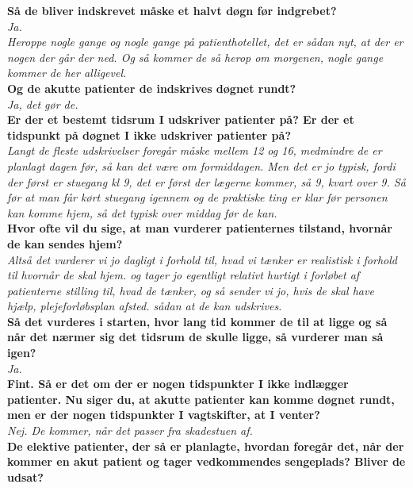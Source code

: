 \noindent
\textbf{Så de bliver indskrevet måske et halvt døgn før indgrebet?} \\
\noindent
\textit{Ja.} \\
\noindent
\textit{Heroppe nogle gange og nogle gange på patienthotellet, det er sådan nyt, at der er nogen der går der ned. Og så kommer de så herop om morgenen, nogle gange kommer de her alligevel.} \\
\noindent
\textbf{Og de akutte patienter de indskrives døgnet rundt?} \\
\noindent
\textit{ Ja, det gør de.} \\
\noindent
\textbf{Er der et bestemt tidsrum I udskriver patienter på? Er der et tidspunkt på døgnet I ikke udskriver patienter på?} \\
\noindent
\textit{Langt de fleste udskrivelser foregår måske mellem 12 og 16, medmindre de er planlagt dagen før, så kan det være om formiddagen. Men det er jo typisk, fordi der først er stuegang kl 9, det er først der lægerne kommer, så 9, kvart over 9. Så før at man får kørt stuegang igennem og de praktiske ting er klar før personen kan komme hjem, så det typisk over middag før de kan. } \\
\noindent
\textbf{Hvor ofte vil du sige, at man vurderer patienternes tilstand, hvornår de kan sendes hjem?}  \\
\noindent
\textit{Altså det vurderer vi jo dagligt i forhold til, hvad vi tænker er realistisk i forhold til hvornår de skal hjem. og tager jo egentligt relativt hurtigt i forløbet af patienterne stilling til, hvad de tænker, og så sender vi jo, hvis de skal have hjælp, plejeforløbsplan afsted. sådan at de kan udskrives.} \\
\noindent
\textbf{Så det vurderes i starten, hvor lang tid kommer de til at ligge og så når det nærmer sig det tidsrum de skulle ligge, så vurderer man så igen?} \\
\noindent
\textit{Ja.} \\
\noindent
\textbf{Fint. Så er det om der er nogen tidspunkter I ikke indlægger patienter. Nu siger du, at akutte patienter kan komme døgnet rundt, men er der nogen tidspunkter I vagtskifter, at I venter?} \\
\noindent
\textit{Nej. De kommer, når det passer fra skadestuen af.} \\
\noindent
\textbf{De elektive patienter, der så er planlagte, hvordan foregår det, når der kommer en akut patient og tager vedkommendes sengeplads? Bliver de udsat?} \\
\noindent
